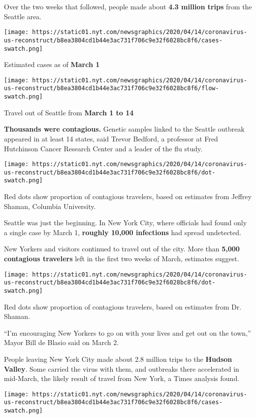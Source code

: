 Over the two weeks that followed, people made about \textbf{4.3 million
trips} from the Seattle area.

\texttt{[image: https://static01.nyt.com/newsgraphics/2020/04/14/coronavirus-us-reconstruct/b8ea3804cd1b44e3ac731f706c9e32f6028bc8f6/cases-swatch.png]}

Estimated cases as of \textbf{March 1}

\texttt{[image: https://static01.nyt.com/newsgraphics/2020/04/14/coronavirus-us-reconstruct/b8ea3804cd1b44e3ac731f706c9e32f6028bc8f6/flow-swatch.png]}

Travel out of Seattle from \textbf{March 1 to 14}

\textbf{Thousands were contagious.} Genetic samples linked to the
Seattle outbreak appeared in at least 14 states, said Trevor Bedford, a
professor at Fred Hutchinson Cancer Research Center and a leader of the
flu study.

\texttt{[image: https://static01.nyt.com/newsgraphics/2020/04/14/coronavirus-us-reconstruct/b8ea3804cd1b44e3ac731f706c9e32f6028bc8f6/dot-swatch.png]}

Red dots show proportion of contagious travelers, based on estimates
from Jeffrey Shaman, Columbia University.

Seattle was just the beginning. In New York City, where officials had
found only a single case by March 1, \textbf{roughly 10,000 infections}
had spread undetected.

New Yorkers and visitors continued to travel out of the city. More than
\textbf{5,000 contagious travelers} left in the first two weeks of
March, estimates suggest.

\texttt{[image: https://static01.nyt.com/newsgraphics/2020/04/14/coronavirus-us-reconstruct/b8ea3804cd1b44e3ac731f706c9e32f6028bc8f6/dot-swatch.png]}

Red dots show proportion of contagious travelers, based on estimates
from Dr. Shaman.

``I'm encouraging New Yorkers to go on with your lives and get out on
the town,'' Mayor Bill de Blasio said on March 2.

People leaving New York City made about 2.8 million trips to the
\textbf{Hudson Valley}. Some carried the virus with them, and outbreaks
there accelerated in mid-March, the likely result of travel from New
York, a Times analysis found.

\texttt{[image: https://static01.nyt.com/newsgraphics/2020/04/14/coronavirus-us-reconstruct/b8ea3804cd1b44e3ac731f706c9e32f6028bc8f6/cases-swatch.png]}

